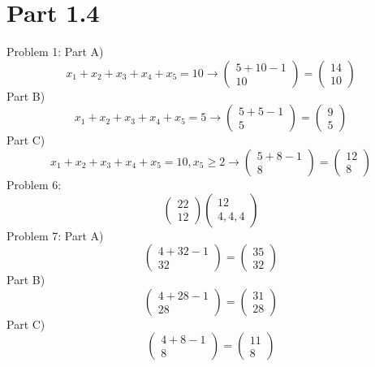 \documentclass{article}
\begin{document}
\section{Part 1.4}
	Problem 1: Part A)
	$$
	x_1+x_2+x_3+x_4+x_5=10 \rightarrow
	\left(\begin{array}{c}
	5+10-1\\
	10
	\end{array}\right)
	=
	\left(\begin{array}{c}
	14\\
	10
	\end{array}\right)
	$$
	Part B)
	$$
	x_1+x_2+x_3+x_4+x_5=5 \rightarrow
	\left(\begin{array}{c}
	5+5-1\\
	5
	\end{array}\right)
	=
	\left(\begin{array}{c}
	9\\
	5
	\end{array}\right)
	$$
	Part C)
	$$
	x_1+x_2+x_3+x_4+x_5=10 , x_5 \geq 2
	\rightarrow
	\left(\begin{array}{c}
	5+8-1\\
	8
	\end{array}\right)
	=
	\left(\begin{array}{c}
	12\\
	8
	\end{array}\right)
	$$
	Problem 6:
	$$
	\left(\begin{array}{c}
	22\\
	12
	\end{array}\right)
	\left(\begin{array}{c}
	12\\
	4,4,4
	\end{array}\right)
	$$
	Problem 7: Part A)
	$$
	\left(\begin{array}{c}
	4+32-1\\
	32
	\end{array}\right)
	=
	\left(\begin{array}{c}
	35\\
	32
	\end{array}\right)
	$$
	Part B)
	$$
	\left(\begin{array}{c}
	4+28-1\\
	28
	\end{array}\right)
	=
	\left(\begin{array}{c}
	31\\
	28
	\end{array}\right)
	$$
	Part C)
	$$
	\left(\begin{array}{c}
	4+8-1\\
	8
	\end{array}\right)
	=
	\left(\begin{array}{c}
	11\\
	8
	\end{array}\right)
	$$
\end{document}
